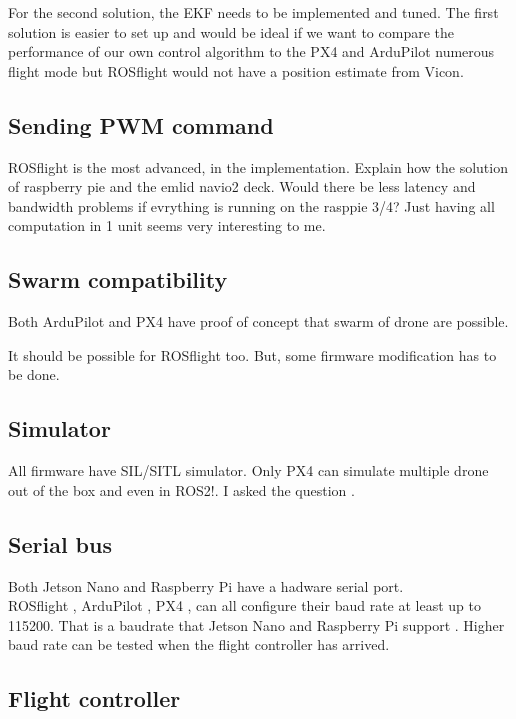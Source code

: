 For the second solution, the EKF needs to be implemented and tuned.
The first solution is easier to set up and would be ideal if we want to compare the performance of our own control algorithm to the PX4 and ArduPilot numerous flight mode but ROSflight would not have a position estimate from Vicon.

\subsection{Sending PWM command}
ROSflight is the most advanced, in the implementation.
{\color{red}Explain how the solution of raspberry pie and the emlid navio2 deck. Would there be less latency and bandwidth problems if evrything is running on the rasppie 3/4? Just having all computation in 1 unit seems very interesting to me.}

\subsection{Swarm compatibility}
Both ArduPilot \cite{ardupilot_multi_vehicle} and PX4 \cite{px4_multi_vehicle}
have proof of concept that swarm of drone are possible.

It should be possible for ROSflight \cite{github_rosflight_100} too.
But, some firmware modification has to be done.

\subsection{Simulator}
All firmware have SIL/SITL simulator.
Only PX4 can simulate multiple drone out of the box {\color{red}and even in ROS2!}. I asked the question \cite{px4_ros2}.

\subsection{Serial bus}
Both Jetson Nano and Raspberry Pi have a hadware serial port.\\
ROSflight \cite{rosflight_parameters},
ArduPilot \cite{ardupilot_serial_parameters},
PX4 \cite{px4_serial_parameters},
can all configure their baud rate at least up to 115200. That is a baudrate that
Jetson Nano \cite{jetsonhacks_serial}
and
Raspberry Pi support \cite{rpi_stackexchange_serial}.
Higher baud rate can be tested when the flight controller has arrived.



\subsection{Flight controller}
